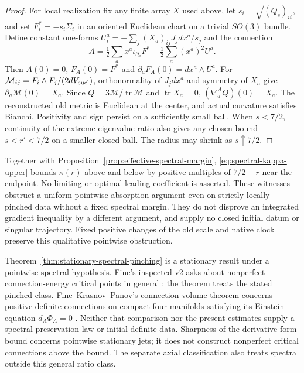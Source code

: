 \documentclass[11pt]{article}
\numberwithin{equation}{section}
\theoremstyle{definition}
\theoremstyle{remark}
\DeclareMathOperator{\tr}{tr}
\begin{document}
\begin{proof}
For local realization fix any finite array $X$ used above,
let $s_i=\sqrt{(Q_s)_{ii}}$, and set $F_i^*=-s_i\Sigma_i$
in an oriented Euclidean chart on a trivial $SO(3)$ bundle.
Define constant one-forms
$U_i^a=-\sum_j(X_a)_{ij}J_jdx^a/s_j$ and the connection
\[
 A=\tfrac12\sum_a x^a\iota_{\partial_a}F^*
                  +\tfrac12\sum_a(x^a)^2U^a.
\]
Then $A(0)=0$, $F_A(0)=F^*$ and
$\partial_aF_A(0)=dx^a\wedge U^a$.
For $\mathcal M_{ij}=F_i\wedge F_j/(2dV_{\rm eucl})$,
orthonormality of $J_jdx^a$ and symmetry of $X_a$ give
$\partial_a\mathcal M(0)=X_a$. Since
$Q=3\mathcal M/\tr\mathcal M$ and $\tr X_a=0$,
$(\nabla_a^AQ)(0)=X_a$. The reconstructed old metric is
Euclidean at the center, and actual curvature satisfies
Bianchi. Positivity and sign persist on a sufficiently small
ball. When $s<7/2$, continuity of the extreme eigenvalue ratio
also gives any chosen bound $s<r'<7/2$ on a smaller closed
ball. The radius may shrink as $s\uparrow7/2$.
\end{proof}

Together with Proposition~\ref{prop:effective-spectral-margin},
\eqref{eq:spectral-kappa-upper} bounds \(\kappa(r)\) above and
below by positive multiples of \(7/2-r\) near the endpoint.
No limiting or optimal leading coefficient is asserted.
These witnesses obstruct a uniform pointwise absorption
argument even on strictly locally pinched data without a fixed
spectral margin. They do not disprove an integrated gradient
inequality by a different argument, and supply no closed
initial datum or singular trajectory. Fixed positive changes
of the old scale and native clock preserve this qualitative
pointwise obstruction.


Theorem~\ref{thm:stationary-spectral-pinching} is a stationary
result under a pointwise spectral hypothesis. Fine's inspected v2 asks about nonperfect
connection-energy critical points in general
\cite[\S1.6]{Fine2011}; the theorem treats the stated pinched
class. Fine--Krasnov--Panov's connection-volume theorem
concerns positive definite connections on compact four-manifolds
satisfying its Einstein equation $d_A\Phi_A=0$
\cite[Theorem~4.14]{FineKrasnovPanov2014}. Neither that comparison
nor the present estimates supply a spectral preservation law
or initial definite data. Sharpness of the derivative-form bound
concerns pointwise stationary jets; it does not construct
nonperfect critical connections above the bound. The separate
axial classification also treats spectra outside this general
ratio class.
\end{document}
